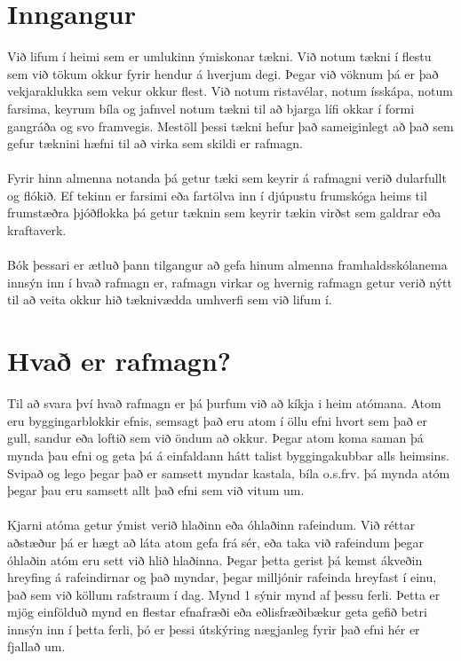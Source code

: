 

\newpage

\section{Inngangur}

Við lifum í heimi sem er umlukinn ýmiskonar tækni. Við notum tækni í flestu sem við tökum okkur fyrir hendur á hverjum degi. Þegar við vöknum þá er það vekjaraklukka sem vekur okkur flest. Við notum ristavélar, notum ísskápa, notum farsima, keyrum bíla og jafnvel notum tækni til að bjarga lífi okkar í formi gangráða og svo framvegis. Mestöll þessi tækni hefur það sameiginlegt að það sem gefur tæknini hæfni til að virka sem skildi er rafmagn.
\\ \\
Fyrir hinn almenna notanda þá getur tæki sem keyrir á rafmagni verið dularfullt og flókið. Ef tekinn er farsimi eða fartölva inn í djúpustu frumskóga heims til frumstæðra þjóðflokka þá getur tæknin sem keyrir tækin virðst sem galdrar eða kraftaverk.
\\ \\
Bók þessari er ætluð þann tilgangur að gefa hinum almenna framhaldsskólanema innsýn inn í hvað rafmagn er, rafmagn virkar og hvernig rafmagn getur verið nýtt til að veita okkur hið tæknivædda umhverfi sem við lifum í.


\section{Hvað er rafmagn?}
Til að svara því hvað rafmagn er þá þurfum við að kíkja i heim atómana. Atom eru byggingarblokkir efnis, semsagt það eru atom í öllu efni hvort sem það er gull, sandur eða loftið sem við öndum að okkur. Þegar atom koma saman þá mynda þau efni og geta þá á einfaldann hátt talist byggingakubbar alls heimsins. Svipað og lego þegar það er samsett myndar kastala, bíla o.s.frv. þá mynda atóm þegar þau eru samsett allt það efni sem við vitum um. 
\\ \\ 
Kjarni atóma getur ýmist verið hlaðinn eða óhlaðinn rafeindum. Við réttar aðstæður þá er hægt að láta atom gefa frá sér, eða taka við rafeindum þegar óhlaðin atóm eru sett við hlið hlaðinna. Þegar þetta gerist þá kemst ákveðin hreyfing á rafeindirnar og það myndar, þegar milljónir rafeinda hreyfast í einu, það sem við köllum rafstraum í dag. Mynd 1 sýnir mynd af þessu ferli. Þetta er mjög einfölduð mynd en flestar efnafræði eða eðlisfræðibækur geta gefið betri innsýn inn í þetta ferli, þó er þessi útskýring nægjanleg fyrir það efni hér er fjallað um. 

